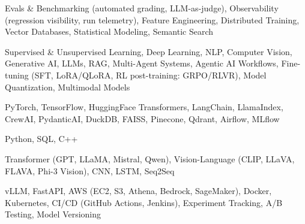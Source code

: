 \documentclass[letter,10pt]{article}
\begin{document}
 Evals \& Benchmarking (automated grading, LLM-as-judge), Observability (regression visibility, run telemetry), Feature Engineering, Distributed Training, Vector Databases, Statistical Modeling, Semantic Search\par\vspace{2pt}

 Supervised \& Unsupervised Learning, Deep Learning, NLP, Computer Vision, Generative AI, LLMs, RAG, Multi-Agent Systems, Agentic AI Workflows, Fine-tuning (SFT, LoRA/QLoRA, RL post-training: GRPO/RLVR), Model Quantization, Multimodal Models\par\vspace{2pt}

 PyTorch, TensorFlow, HuggingFace Transformers, LangChain, LlamaIndex, CrewAI, PydanticAI, DuckDB, FAISS, Pinecone, Qdrant, Airflow, MLflow\par\vspace{2pt}

 Python, SQL, C++\par\vspace{2pt}

 Transformer (GPT, LLaMA, Mistral, Qwen), Vision-Language (CLIP, LLaVA, FLAVA, Phi-3 Vision), CNN, LSTM, Seq2Seq\par\vspace{2pt}

 vLLM, FastAPI, AWS (EC2, S3, Athena, Bedrock, SageMaker), Docker, Kubernetes, CI/CD (GitHub Actions, Jenkins), Experiment Tracking, A/B Testing, Model Versioning
\end{document}

